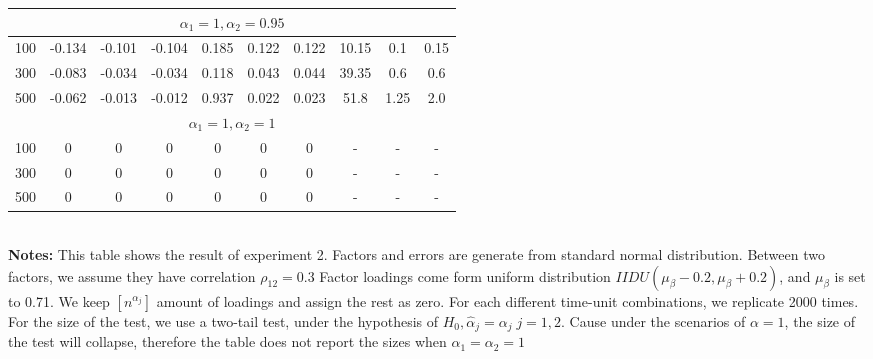 \begin{table}[]
\begin{tabular}{lccccccccc}
		\multicolumn{10}{c}{$\alpha_1 = 1, \alpha_2 = 0.95$}                                                                                                                          \\ \hline
		\multicolumn{1}{l|}{100}                & -0.134 & -0.101 & \multicolumn{1}{c|}{-0.104} & 0.185 & 0.122 & \multicolumn{1}{c|}{0.122} & 10.15        & 0.1        & 0.15       \\
		\multicolumn{1}{l|}{300}                & -0.083 & -0.034 & \multicolumn{1}{c|}{-0.034} & 0.118 & 0.043 & \multicolumn{1}{c|}{0.044} & 39.35        & 0.6        & 0.6        \\
		\multicolumn{1}{l|}{500}                & -0.062 & -0.013 & \multicolumn{1}{c|}{-0.012} & 0.937 & 0.022 & \multicolumn{1}{c|}{0.023} & 51.8         & 1.25       & 2.0        \\ \hline
		\multicolumn{10}{c}{$\alpha_1=1, \alpha_2 = 1$}                                                                                                                               \\ \hline
		\multicolumn{1}{l|}{100}                & 0      & 0      & \multicolumn{1}{c|}{0}      & 0     & 0     & \multicolumn{1}{c|}{0}     & -            & -          & -          \\
		\multicolumn{1}{l|}{300}                & 0      & 0      & \multicolumn{1}{c|}{0}      & 0     & 0     & \multicolumn{1}{c|}{0}     & -            & -          & -          \\
		\multicolumn{1}{l|}{500}                & 0      & 0      & \multicolumn{1}{c|}{0}      & 0     & 0     & \multicolumn{1}{c|}{0}     & -            & -          & -          \\ \hline\hline
	\end{tabular}
\bigskip \\
{\bf Notes:}
This table shows the result of  experiment 2.
Factors and errors are generate from standard normal distribution.
Between two factors, we assume they have correlation $\rho_{12} = 0.3$
Factor loadings come form uniform distribution $IIDU(\mu_{\beta} - 0.2, \mu_{\beta}+0.2)$, and $\mu_{\beta}$ is set to 0.71.
We keep  $[n^{\alpha_{j}}]$ amount of loadings and assign the rest as zero.
For each different time-unit combinations, we replicate 2000 times.
For the size of the test, we use a two-tail test, under the hypothesis of $H_0, \hat{\alpha}_j = \alpha_j\; j=1,2$.
Cause under the scenarios of $\alpha = 1$, the size of the test will collapse, therefore the table does not report the sizes when $\alpha_1 = \alpha_2 = 1$
\end{table}


%